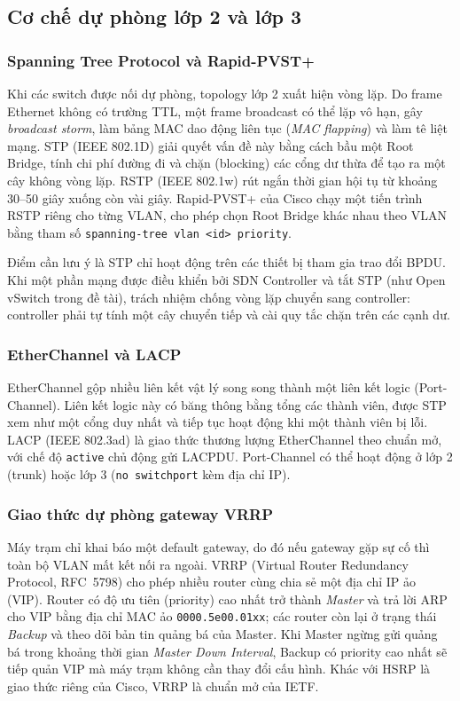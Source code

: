 \subsection{Cơ chế dự phòng lớp 2 và lớp 3}

\subsubsection{Spanning Tree Protocol và Rapid-PVST+}

Khi các switch được nối dự phòng, topology lớp 2 xuất hiện vòng lặp. Do frame Ethernet không có trường TTL, một frame broadcast có thể lặp vô hạn, gây \textit{broadcast storm}, làm bảng MAC dao động liên tục (\textit{MAC flapping}) và làm tê liệt mạng. STP (IEEE 802.1D) giải quyết vấn đề này bằng cách bầu một Root Bridge, tính chi phí đường đi và chặn (blocking) các cổng dư thừa để tạo ra một cây không vòng lặp. RSTP (IEEE 802.1w) rút ngắn thời gian hội tụ từ khoảng 30--50 giây xuống còn vài giây. Rapid-PVST+ của Cisco chạy một tiến trình RSTP riêng cho từng VLAN, cho phép chọn Root Bridge khác nhau theo VLAN bằng tham số \texttt{spanning-tree vlan <id> priority}.

Điểm cần lưu ý là STP chỉ hoạt động trên các thiết bị tham gia trao đổi BPDU. Khi một phần mạng được điều khiển bởi SDN Controller và tắt STP (như Open vSwitch trong đề tài), trách nhiệm chống vòng lặp chuyển sang controller: controller phải tự tính một cây chuyển tiếp và cài quy tắc chặn trên các cạnh dư.

\subsubsection{EtherChannel và LACP}

EtherChannel gộp nhiều liên kết vật lý song song thành một liên kết logic (Port-Channel). Liên kết logic này có băng thông bằng tổng các thành viên, được STP xem như một cổng duy nhất và tiếp tục hoạt động khi một thành viên bị lỗi. LACP (IEEE 802.3ad) là giao thức thương lượng EtherChannel theo chuẩn mở, với chế độ \texttt{active} chủ động gửi LACPDU. Port-Channel có thể hoạt động ở lớp 2 (trunk) hoặc lớp 3 (\texttt{no switchport} kèm địa chỉ IP).

\subsubsection{Giao thức dự phòng gateway VRRP}

Máy trạm chỉ khai báo một default gateway, do đó nếu gateway gặp sự cố thì toàn bộ VLAN mất kết nối ra ngoài. VRRP (Virtual Router Redundancy Protocol, RFC~5798) cho phép nhiều router cùng chia sẻ một địa chỉ IP ảo (VIP). Router có độ ưu tiên (priority) cao nhất trở thành \textit{Master} và trả lời ARP cho VIP bằng địa chỉ MAC ảo \texttt{0000.5e00.01xx}; các router còn lại ở trạng thái \textit{Backup} và theo dõi bản tin quảng bá của Master. Khi Master ngừng gửi quảng bá trong khoảng thời gian \textit{Master Down Interval}, Backup có priority cao nhất sẽ tiếp quản VIP mà máy trạm không cần thay đổi cấu hình. Khác với HSRP là giao thức riêng của Cisco, VRRP là chuẩn mở của IETF.

